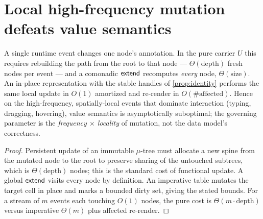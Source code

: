 \documentclass[../uxoxo-main]{subfiles}
\begin{document}
\section{Local high-frequency mutation defeats value semantics}\label{sec:mutation}
\begin{proposition}\label{prop:cost}
A single runtime event changes one node's annotation. In the pure carrier $U$ this
requires rebuilding the path from the root to that node --- $\Theta(\mathrm{depth})$
fresh nodes per event --- and a comonadic $\mathsf{extend}$ recomputes \emph{every} node,
$\Theta(\mathrm{size})$. An in-place representation with the stable handles of
\cref{prop:identity} performs the same local update in $O(1)$ amortized and re-render
in $O(\#\text{affected})$. Hence on the high-frequency, spatially-local events that
dominate interaction (typing, dragging, hovering), value semantics is asymptotically
suboptimal; the governing parameter is the \emph{frequency $\times$ locality} of
mutation, not the data model's correctness.
\end{proposition}

\begin{proof}
Persistent update of an immutable $\mu$-tree must allocate a new spine from the
mutated node to the root to preserve sharing of the untouched subtrees, which is
$\Theta(\mathrm{depth})$ nodes; this is the standard cost of functional update. A
global $\mathsf{extend}$ visits every node by definition. An imperative table mutates the
target cell in place and marks a bounded dirty set, giving the stated bounds. For a
stream of $m$ events each touching $O(1)$ nodes, the pure cost is
$\Theta(m\cdot\mathrm{depth})$ versus imperative $\Theta(m)$ plus affected re-render.
\end{proof}
\end{document}
